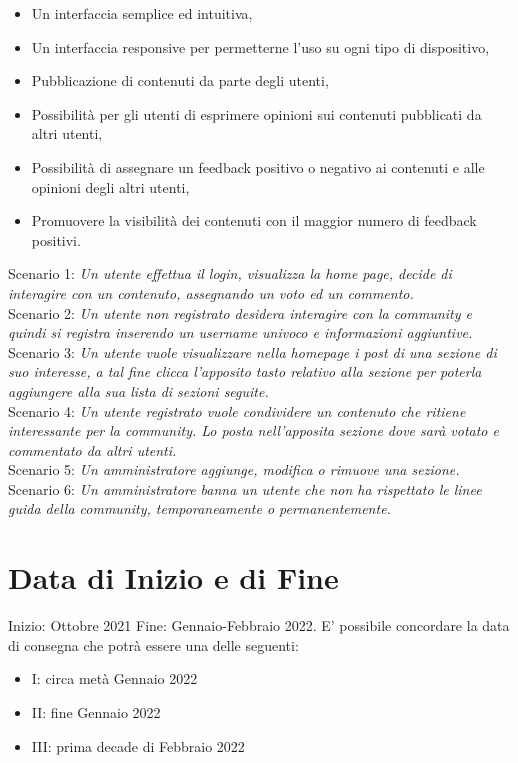 \documentclass[12pt]{article}
\begin{document}
  \begin{itemize}
  
  \item Un interfaccia semplice ed intuitiva,
  \item Un interfaccia responsive per permetterne l’uso su ogni tipo di dispositivo,
  \item Pubblicazione di contenuti da parte degli utenti,
  \item Possibilità per gli utenti di esprimere opinioni sui contenuti pubblicati da altri utenti,
  \item Possibilità di assegnare un feedback positivo o negativo ai contenuti e alle opinioni degli altri utenti,
  \item Promuovere la visibilità dei contenuti con il maggior numero di feedback positivi.
  
  \end{itemize}
  Scenario 1:
  \emph{Un utente effettua il login, visualizza la home page, decide di interagire con un contenuto, assegnando un voto ed un commento.}
\\
  Scenario 2:
  \emph{Un utente non registrato desidera interagire con la community e quindi si registra inserendo un username univoco e informazioni aggiuntive.}
\\
  Scenario 3:
  \emph{Un utente vuole visualizzare nella homepage i post di una sezione di suo interesse, a tal fine clicca l'apposito tasto relativo alla sezione per poterla aggiungere alla sua lista di sezioni seguite.}
\\
  Scenario 4:
  \emph{Un utente registrato vuole condividere un contenuto che ritiene interessante per la community. Lo posta nell'apposita sezione dove sarà votato e commentato da altri utenti.}
\\
  Scenario 5:
  \emph{Un amministratore aggiunge, modifica o rimuove una sezione.}
\\
  Scenario 6:
  \emph{Un amministratore banna un utente che non ha rispettato le linee guida della community, temporaneamente o permanentemente.}

  
  \section{Data di Inizio e di Fine}
  Inizio: Ottobre 2021
  Fine: Gennaio-Febbraio 2022. E’ possibile concordare la data di consegna che potrà essere una delle seguenti:
  
  \begin{itemize}
      \item I: circa metà Gennaio 2022
      \item II: fine Gennaio 2022
      \item III: prima decade di Febbraio 2022
  \end{itemize}
  
\end{document}

